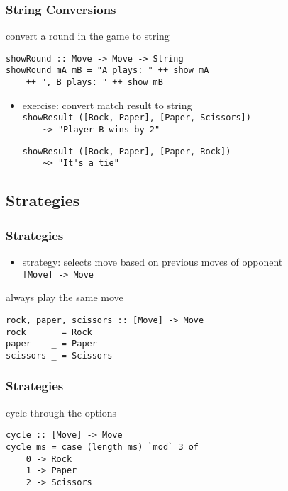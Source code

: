 \documentclass[dvipsnames]{beamer}
\theoremstyle{plain}
\begin{document}
\begin{frame}[fragile]
  \frametitle{String Conversions}

  \begin{exampleblock}{convert a round in the game to string}
    \begin{lstlisting}
showRound :: Move -> Move -> String
showRound mA mB = "A plays: " ++ show mA
    ++ ", B plays: " ++ show mB
    \end{lstlisting}
  \end{exampleblock}

  \pause
  \vspace{-12pt}
  \begin{itemize}
    \item exercise: convert match result to string\\
      \lstinline|showResult ([Rock, Paper], [Paper, Scissors])|\\
      \lstinline|    ~> "Player B wins by 2"|

      \smallskip
      \lstinline|showResult ([Rock, Paper], [Paper, Rock])|\\
      \lstinline|    ~> "It's a tie"|
  \end{itemize}
\end{frame}

\subsection{Strategies}

\begin{frame}[fragile]
  \frametitle{Strategies}

  \begin{itemize}
    \item strategy: selects move based on previous moves of opponent\\
      \lstinline|[Move] -> Move|
  \end{itemize}

  \begin{exampleblock}{always play the same move}
    \begin{lstlisting}
rock, paper, scissors :: [Move] -> Move
rock     _ = Rock
paper    _ = Paper
scissors _ = Scissors
    \end{lstlisting}
  \end{exampleblock}
\end{frame}

\begin{frame}[fragile]
  \frametitle{Strategies}

  \begin{exampleblock}{cycle through the options}
    \begin{lstlisting}[deletekeywords={cycle}]
cycle :: [Move] -> Move
cycle ms = case (length ms) `mod` 3 of
    0 -> Rock
    1 -> Paper
    2 -> Scissors
    \end{lstlisting}
  \end{exampleblock}
\end{frame}
\end{document}
